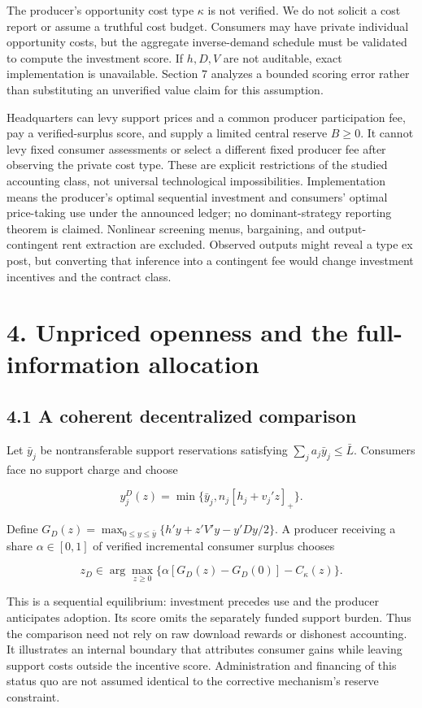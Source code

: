 \documentclass[
  11pt,
]{article}
\begin{document}
The producer's opportunity cost type \(\kappa\) is not verified. We do
not solicit a cost report or assume a truthful cost budget. Consumers
may have private individual opportunity costs, but the aggregate
inverse-demand schedule must be validated to compute the investment
score. If \(h,D,V\) are not auditable, exact implementation is
unavailable. Section 7 analyzes a bounded scoring error rather than
substituting an unverified value claim for this assumption.

Headquarters can levy support prices and a common producer participation
fee, pay a verified-surplus score, and supply a limited central reserve
\(B\geq0\). It cannot levy fixed consumer assessments or select a
different fixed producer fee after observing the private cost type.
These are explicit restrictions of the studied accounting class, not
universal technological impossibilities. Implementation means the
producer's optimal sequential investment and consumers' optimal
price-taking use under the announced ledger; no dominant-strategy
reporting theorem is claimed. Nonlinear screening menus, bargaining, and
output-contingent rent extraction are excluded. Observed outputs might
reveal a type ex post, but converting that inference into a contingent
fee would change investment incentives and the contract class.

\section{4. Unpriced openness and the full-information
allocation}\label{unpriced-openness-and-the-full-information-allocation}

\subsection{4.1 A coherent decentralized
comparison}\label{a-coherent-decentralized-comparison}

Let \(\bar y_j\) be nontransferable support reservations satisfying
\(\sum_j a_j\bar y_j\leq\bar L\). Consumers face no support charge and
choose

\[y_j^D(z)=\min\{\bar y_j,n_j[h_j+v_j'z]_+\}. \tag{5}\]

Define \(G_D(z)=\max_{0\leq y\leq\bar y}\{h'y+z'V'y-y'Dy/2\}\). A
producer receiving a share \(\alpha\in[0,1]\) of verified incremental
consumer surplus chooses

\[z_D\in\arg\max_{z\geq0}\{\alpha[G_D(z)-G_D(0)]-C_\kappa(z)\}. \tag{6}\]

This is a sequential equilibrium: investment precedes use and the
producer anticipates adoption. Its score omits the separately funded
support burden. Thus the comparison need not rely on raw download
rewards or dishonest accounting. It illustrates an internal boundary
that attributes consumer gains while leaving support costs outside the
incentive score. Administration and financing of this status quo are not
assumed identical to the corrective mechanism's reserve constraint.
\end{document}
